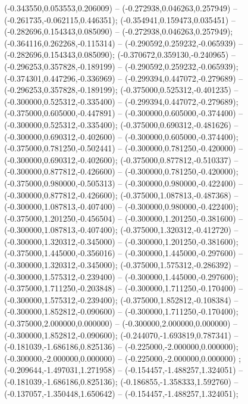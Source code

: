  (-0.343550,0.053553,0.206009) -- (-0.272938,0.046263,0.257949) -- (-0.261735,-0.062115,0.446351);
 (-0.354941,0.159473,0.035451) -- (-0.282696,0.154343,0.085090) -- (-0.272938,0.046263,0.257949);
 (-0.364116,0.262268,-0.115314) -- (-0.290592,0.259232,-0.065939) -- (-0.282696,0.154343,0.085090);
 (-0.370672,0.359130,-0.240965) -- (-0.296253,0.357828,-0.189199) -- (-0.290592,0.259232,-0.065939);
 (-0.374301,0.447296,-0.336969) -- (-0.299394,0.447072,-0.279689) -- (-0.296253,0.357828,-0.189199);
 (-0.375000,0.525312,-0.401235) -- (-0.300000,0.525312,-0.335400) -- (-0.299394,0.447072,-0.279689);
 (-0.375000,0.605000,-0.447891) -- (-0.300000,0.605000,-0.374400) -- (-0.300000,0.525312,-0.335400);
 (-0.375000,0.690312,-0.481626) -- (-0.300000,0.690312,-0.402600) -- (-0.300000,0.605000,-0.374400);
 (-0.375000,0.781250,-0.502441) -- (-0.300000,0.781250,-0.420000) -- (-0.300000,0.690312,-0.402600);
 (-0.375000,0.877812,-0.510337) -- (-0.300000,0.877812,-0.426600) -- (-0.300000,0.781250,-0.420000);
 (-0.375000,0.980000,-0.505313) -- (-0.300000,0.980000,-0.422400) -- (-0.300000,0.877812,-0.426600);
 (-0.375000,1.087813,-0.487368) -- (-0.300000,1.087813,-0.407400) -- (-0.300000,0.980000,-0.422400);
 (-0.375000,1.201250,-0.456504) -- (-0.300000,1.201250,-0.381600) -- (-0.300000,1.087813,-0.407400);
 (-0.375000,1.320312,-0.412720) -- (-0.300000,1.320312,-0.345000) -- (-0.300000,1.201250,-0.381600);
 (-0.375000,1.445000,-0.356016) -- (-0.300000,1.445000,-0.297600) -- (-0.300000,1.320312,-0.345000);
 (-0.375000,1.575312,-0.286392) -- (-0.300000,1.575312,-0.239400) -- (-0.300000,1.445000,-0.297600);
 (-0.375000,1.711250,-0.203848) -- (-0.300000,1.711250,-0.170400) -- (-0.300000,1.575312,-0.239400);
 (-0.375000,1.852812,-0.108384) -- (-0.300000,1.852812,-0.090600) -- (-0.300000,1.711250,-0.170400);
 (-0.375000,2.000000,0.000000) -- (-0.300000,2.000000,0.000000) -- (-0.300000,1.852812,-0.090600);
 (-0.244070,-1.693819,0.787341) -- (-0.181039,-1.686186,0.825136) -- (-0.225000,-2.000000,0.000000);
 (-0.300000,-2.000000,0.000000) -- (-0.225000,-2.000000,0.000000) ;
 (-0.209644,-1.497031,1.271958) -- (-0.154457,-1.488257,1.324051) -- (-0.181039,-1.686186,0.825136);
 (-0.186855,-1.358333,1.592760) -- (-0.137057,-1.350448,1.650642) -- (-0.154457,-1.488257,1.324051);
